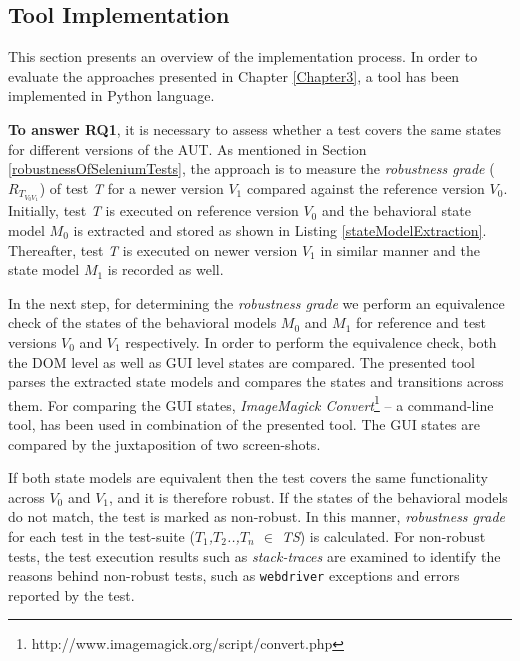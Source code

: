 \subsection{Tool Implementation}
\label{toolimplementation}
This section presents an overview of the implementation process. In order to evaluate the approaches presented in Chapter \ref{Chapter3}, a tool has been implemented in Python language. 

\textbf{To answer RQ1}, it is necessary to assess whether a test covers the same states for different versions of the AUT. As mentioned in Section \ref{robustnessOfSeleniumTests}, the approach is to measure the  \textit{robustness grade} ($R_{T_{V_{0}V_{1}}}$) of test \textit{T} for a newer version \textit{$V_{1}$} compared against the reference version \textit{$V_{0}$}. Initially, test \textit{T} is executed on reference version \textit{$V_{0}$} and the behavioral state model \textit{$M_{0}$} is extracted and stored as shown in Listing \ref{stateModelExtraction}. Thereafter, test \textit{T} is executed on newer version \textit{$V_{1}$} in similar manner and the state model \textit{$M_{1}$} is recorded as well.

In the next step, for determining the \textit{robustness grade} we perform an equivalence check of the states of the behavioral models  \textit{$M_{0}$} and \textit{$M_{1}$} for reference and test versions \textit{$V_{0}$} and \textit{$V_{1}$} respectively.  
In order to perform the equivalence check, both the DOM level as well as GUI level states are compared. The presented tool parses the extracted state models and compares the states and transitions across them. For comparing the GUI states, \textit{ImageMagick Convert}\footnote{http://www.imagemagick.org/script/convert.php} -- a command-line tool, has been used in combination of the presented tool. The GUI states are compared by the juxtaposition of two screen-shots. 

If both state models are equivalent then the test covers the same functionality across  \textit{$V_{0}$} and \textit{$V_{1}$}, and it is therefore robust. If the states of the behavioral models do not match, the test is marked as non-robust. In this manner, \textit{robustness grade} for each test in the test-suite (\textit{$T_1$,$T_2$..,$T_n$ $\in$ TS}) is calculated. For non-robust tests, the test execution results such as \textit{stack-traces} are examined to identify the reasons behind non-robust tests, such as \texttt{webdriver} exceptions \cite{SeleniumExceptions} and errors reported by the test. 

